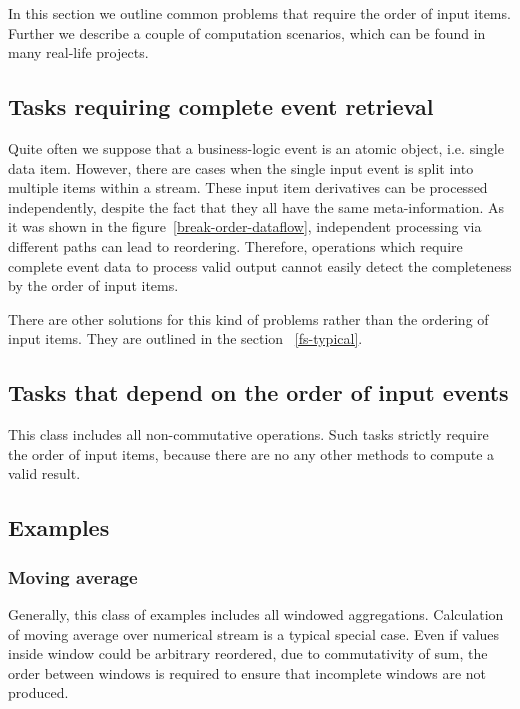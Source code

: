 
\label {fs-tasks}

In this section we outline  common problems that require the order of input items. Further we describe a couple of computation scenarios, which can be found in many real-life projects.

\subsection{Tasks requiring complete event retrieval}
Quite often we suppose that a business-logic event is an atomic object, i.e. single data item. However, there are cases when the single input event is split into multiple items within a stream. These input item derivatives can be processed independently, despite the fact that they all have the same meta-information. As it was shown in the figure~\ref{break-order-dataflow}, independent processing via different paths can lead to reordering. Therefore, operations which require complete event data to process valid output cannot easily detect the completeness by the order of input items.

There are other solutions for this kind of problems rather than the ordering of input items. They are outlined  in the section ~\ref{fs-typical}. 

\subsection{Tasks that depend on the order of input events}
This class includes all non-commutative operations. Such tasks strictly require the order of input items, because there are no any other methods  to compute a valid result.

\subsection{Examples}

\subsubsection{Moving average}
Generally, this class of examples includes all windowed aggregations. Calculation of moving average over numerical stream is a  typical special  case. Even if values inside window could be arbitrary reordered, due to commutativity of sum, the order between windows is required to ensure that incomplete windows are not produced.

